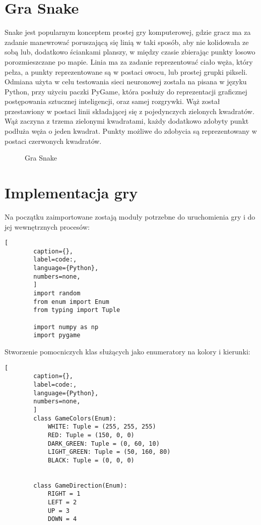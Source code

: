 


\section{Gra Snake}

Snake \cite{SnakeGame} jest popularnym konceptem prostej gry komputerowej, gdzie gracz ma za zadanie manewrować poruszającą się linią w taki sposób, aby nie kolidowała ze sobą lub, dodatkowo ściankami planszy, w między czasie zbierając punkty losowo porozmieszczane po mapie. Linia ma za zadanie reprezentować ciało węża, który pełza, a punkty reprezentowane są w postaci owocu, lub prostej grupki pikseli.
Odmiana użyta w celu testowania sieci neuronowej została na pisana w języku Python, przy użyciu paczki PyGame, która posłuży do reprezentacji graficznej postępowania sztucznej inteligencji, oraz samej rozgrywki.
Wąż został przestawiony w postaci linii składającej się z pojedynczych zielonych kwadratów. Wąż zaczyna z trzema zielonymi kwadratami, każdy dodatkowo zdobyty punkt podłuża węża o jeden kwadrat. Punkty możliwe do zdobycia są reprezentowany w postaci czerwonych kwadratów.

\begin{figure}[h!]
    \centering
    \caption{Gra Snake}
    \label{img:snake_game}
\end{figure}


\section{Implementacja gry}


Na początku zaimportowane zostają moduły potrzebne do uruchomienia gry i do jej wewnętrznych procesów:


\begin{onepage}
    \begin{lstlisting}[
        caption={},
        label=code:,
        language={Python},
        numbers=none,
        ]
        import random
        from enum import Enum
        from typing import Tuple
        
        import numpy as np
        import pygame
    \end{lstlisting}
\end{onepage}



Stworzenie pomocniczych klas służących jako enumeratory na kolory i kierunki:


\begin{onepage}
    \begin{lstlisting}[
        caption={},
        label=code:,
        language={Python},
        numbers=none,
        ]
        class GameColors(Enum):
            WHITE: Tuple = (255, 255, 255)
            RED: Tuple = (150, 0, 0)
            DARK_GREEN: Tuple = (0, 60, 10)
            LIGHT_GREEN: Tuple = (50, 160, 80)
            BLACK: Tuple = (0, 0, 0)
        
        
        class GameDirection(Enum):
            RIGHT = 1
            LEFT = 2
            UP = 3
            DOWN = 4
        
    \end{lstlisting}
\end{onepage}

